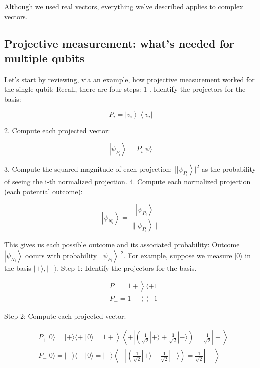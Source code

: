 \documentclass[main.tex]{subfiles}
\begin{document}
    Although we used real vectors, everything we've described applies to complex vectors.

\subsection{Projective measurement: what's needed for multiple qubits}

    Let's start by reviewing, via an example, how projective measurement worked for the single qubit: Recall, there are four steps: 1 . Identify the projectors for the basis:
    
    $$
    P_{i}=\left|v_{i}\right\rangle\left\langle v_{i}\right|
    $$
    
    2. Compute each projected vector:
    
    $$
    \left|\psi_{P_{i}}\right\rangle=P_{i}|\psi\rangle
    $$
    
    3. Compute the squared magnitude of each projection: ||$\left.\psi_{P_{i}}\right\rangle\left.\right|^{2}$ as the probability of seeing the i-th normalized projection. 4. Compute each normalized projection (each potential outcome):
    
    $$
    \left|\psi_{N_{i}}\right\rangle=\frac{\left|\psi_{P_{i}}\right\rangle}{\left.\| \psi_{P_{i}}\right\rangle \mid}
    $$
    
    This gives us each possible outcome and its associated probability: Outcome $\left|\psi_{N_{i}}\right\rangle$ occurs with probability ||$\left.\psi_{P_{i}}\right\rangle\left.\right|^{2}$. For example, suppose we measure $|0\rangle$ in the basis $|+\rangle,|-\rangle$. Step 1: Identify the projectors for the basis.
    
    $$
    \begin{aligned}
    &\left.P_{+}=1+\right\rangle\langle+1 \\
    &\left.P_{-}=1-\right\rangle\langle-1
    \end{aligned}
    $$
    
    Step 2: Compute each projected vector:
    
    $$
    \begin{aligned}
    &\left.P_{+}|0\rangle=|+\rangle\langle+|| 0\rangle=1+\right\rangle\left\langle+\left|\left(\frac{1}{\sqrt{2}}|+\rangle+\frac{1}{\sqrt{2}}|-\rangle\right)=\frac{1}{\sqrt{2}}\right|+\right\rangle \\
    &P_{-}|0\rangle=|-\rangle\langle-|| 0\rangle=|-\rangle\left\langle-\left|\left(\frac{1}{\sqrt{2}}|+\rangle+\frac{1}{\sqrt{2}}|-\rangle\right)=\frac{1}{\sqrt{2}}\right|-\right\rangle
    \end{aligned}
    $$
    
\end{document}

